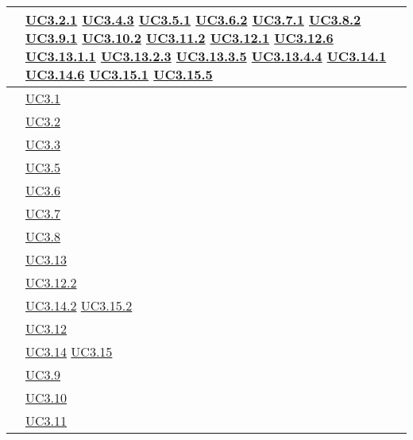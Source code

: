 \begin{longtable}{|P{6cm}|P{6cm}|}
	\hline {} & \hyperref[UC3.2.1]{UC3.2.1} \linebreak \hyperref[UC3.4.3]{UC3.4.3} \linebreak \hyperref[UC3.5.1]{UC3.5.1} \linebreak \hyperref[UC3.6.2]{UC3.6.2} \linebreak \hyperref[UC3.7.1]{UC3.7.1} \linebreak \hyperref[UC3.8.2]{UC3.8.2} \linebreak \hyperref[UC3.9.1]{UC3.9.1} \linebreak \hyperref[UC3.10.2]{UC3.10.2} \linebreak \hyperref[UC3.11.2]{UC3.11.2} \linebreak  \hyperref[UC3.12.1]{UC3.12.1} \linebreak \hyperref[UC3.12.6]{UC3.12.6} \linebreak  \hyperref[UC3.13.1.1]{UC3.13.1.1} \linebreak \hyperref[UC3.13.2.3]{UC3.13.2.3} \linebreak \hyperref[UC3.13.3.5]{UC3.13.3.5} \linebreak \hyperref[UC3.13.4.4]{UC3.13.4.4} \linebreak \hyperref[UC3.14.1]{UC3.14.1} \linebreak \hyperref[UC3.14.6]{UC3.14.6} \linebreak \hyperref[UC3.15.1]{UC3.15.1} \linebreak \hyperref[UC3.15.5]{UC3.15.5} \\
	\hline {} & \hyperref[UC3.1]{UC3.1} \\
	\hline {} & \hyperref[UC3.2]{UC3.2} \\
	\hline {} & \hyperref[UC3.3]{UC3.3} \\
	\hline {} & \hyperref[UC3.5]{UC3.5} \\
	\hline {} & \hyperref[UC3.6]{UC3.6} \\
	\hline {} & \hyperref[UC3.7]{UC3.7} \\
	\hline {} & \hyperref[UC3.8]{UC3.8} \\
	\hline {} & \hyperref[UC3.13]{UC3.13} \\
	\hline {} & \hyperref[UC3.12.2]{UC3.12.2} \\
	\hline {} & \hyperref[UC3.14.2]{UC3.14.2} \linebreak \hyperref[UC3.15.2]{UC3.15.2} \\
	\hline {} & \hyperref[UC3.12]{UC3.12} \\
	\hline {} & \hyperref[UC3.14]{UC3.14} \linebreak \hyperref[UC3.15]{UC3.15} \\
	\hline {} & \hyperref[UC3.9]{UC3.9} \\
	\hline {} & \hyperref[UC3.10]{UC3.10} \\
	\hline {} & \hyperref[UC3.11]{UC3.11} \\	
	\hline
\end{longtable}

